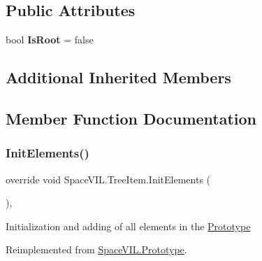 \subsection*{Public Attributes}
\begin{DoxyCompactItemize}
\item 
\mbox{\label{class_space_v_i_l_1_1_tree_item_a63fa934ac6621555237878002d12d17b}} 
bool {\bfseries Is\+Root} = false
\end{DoxyCompactItemize}
\subsection*{Additional Inherited Members}


\subsection{Member Function Documentation}
\mbox{\label{class_space_v_i_l_1_1_tree_item_a4f40a1de34aa41b1eff340f98de81756}} 
\subsubsection{\texorpdfstring{Init\+Elements()}{InitElements()}}
{\footnotesize\ttfamily override void Space\+V\+I\+L.\+Tree\+Item.\+Init\+Elements (\begin{DoxyParamCaption}{ }\end{DoxyParamCaption})\hspace{0.3cm}{\ttfamily [inline]}, {\ttfamily [virtual]}}



Initialization and adding of all elements in the \mbox{\hyperlink{class_space_v_i_l_1_1_prototype}{Prototype}} 



Reimplemented from \mbox{\hyperlink{class_space_v_i_l_1_1_prototype_ac3379fe02923ee155b5b0084abf27420}{Space\+V\+I\+L.\+Prototype}}.

\mbox{\label{class_space_v_i_l_1_1_tree_item_ab12f4f097b10e2a0c7f0b5fd311449d4}} 
